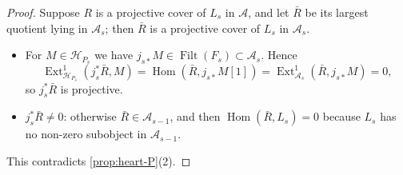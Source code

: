 \documentclass[11pt,reqno]{amsart}
\theoremstyle{plain}
\theoremstyle{definition}
\theoremstyle{remark}
\DeclareMathOperator{\Hom}{Hom}
\DeclareMathOperator{\Ext}{Ext}
\DeclareMathOperator{\Filt}{Filt}
\newcommand{\cA}{\mathcal{A}}
\newcommand{\cH}{\mathcal{H}}
\begin{document}
\begin{proof}
Suppose $R$ is a projective cover of $L_s$ in $\cA$, and let $\bar R$ be its largest quotient lying in $\cA_s$; then $\bar R$ is a projective cover of $L_s$ in $\cA_s$.
\begin{itemize}
\item For $M\in\cH_{P_s}$ we have $j_{s*}M\in\Filt(F_s)\subset\cA_s$. Hence
\[\Ext^1_{\cH_{P_s}}(j_s^*\bar R,M)=\Hom(\bar R,j_{s*}M[1])=\Ext^1_{\cA_s}(\bar R,j_{s*}M)=0,\]
so $j_s^*\bar R$ is projective.
\item $j_s^*\bar R\ne0$: otherwise $\bar R\in\cA_{s-1}$, and then $\Hom(\bar R,L_s)=0$ because $L_s$ has no non-zero subobject in $\cA_{s-1}$.
\end{itemize}
This contradicts \cref{prop:heart-P}(2).
\end{proof}
\end{document}
